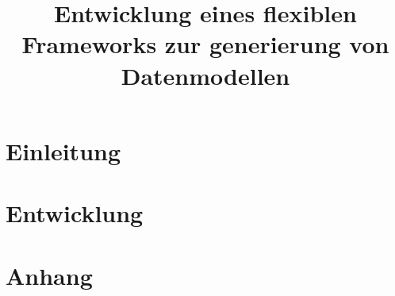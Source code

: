 \documentclass{book}
\title{Entwicklung eines flexiblen Frameworks zur generierung von Datenmodellen}
\begin{document}
\maketitle
\tableofcontents
\chapter{Einleitung}


\chapter{Entwicklung}


\chapter{Anhang}

\end{document}

